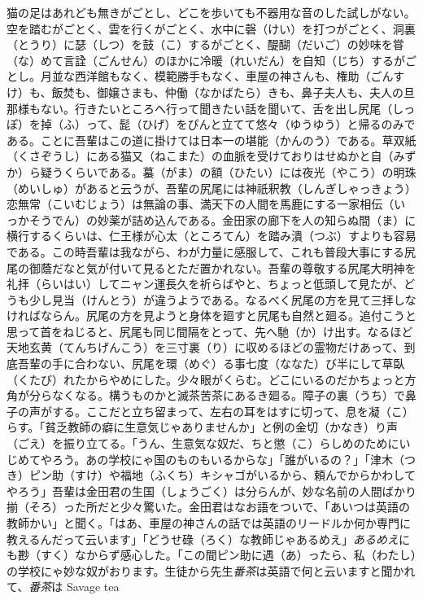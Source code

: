 \documentclass{book}
\begin{document}
猫の足はあれども無きがごとし、どこを歩いても不器用な音のした試しがない。空を踏むがごとく、雲を行くがごとく、水中に磬（けい）を打つがごとく、洞裏（とうり）に瑟（しつ）を鼓（こ）するがごとく、醍醐（だいご）の妙味を甞（な）めて言詮（ごんせん）のほかに冷暖（れいだん）を自知（じち）するがごとし。月並な西洋館もなく、模範勝手もなく、車屋の神さんも、権助（ごんすけ）も、飯焚も、御嬢さまも、仲働（なかばたら）きも、鼻子夫人も、夫人の旦那様もない。行きたいところへ行って聞きたい話を聞いて、舌を出し尻尾（しっぽ）を掉（ふ）って、髭（ひげ）をぴんと立てて悠々（ゆうゆう）と帰るのみである。ことに吾輩はこの道に掛けては日本一の堪能（かんのう）である。草双紙（くさぞうし）にある猫又（ねこまた）の血脈を受けておりはせぬかと自（みずか）ら疑うくらいである。蟇（がま）の額（ひたい）には夜光（やこう）の明珠（めいしゅ）があると云うが、吾輩の尻尾には神祇釈教（しんぎしゃっきょう）恋無常（こいむじょう）は無論の事、満天下の人間を馬鹿にする一家相伝（いっかそうでん）の妙薬が詰め込んである。金田家の廊下を人の知らぬ間（ま）に横行するくらいは、仁王様が心太（ところてん）を踏み潰（つぶ）すよりも容易である。この時吾輩は我ながら、わが力量に感服して、これも普段大事にする尻尾の御蔭だなと気が付いて見るとただ置かれない。吾輩の尊敬する尻尾大明神を礼拝（らいはい）してニャン運長久を祈らばやと、ちょっと低頭して見たが、どうも少し見当（けんとう）が違うようである。なるべく尻尾の方を見て三拝しなければならん。尻尾の方を見ようと身体を廻すと尻尾も自然と廻る。追付こうと思って首をねじると、尻尾も同じ間隔をとって、先へ馳（か）け出す。なるほど天地玄黄（てんちげんこう）を三寸裏（り）に収めるほどの霊物だけあって、到底吾輩の手に合わない、尻尾を環（めぐ）る事七度（ななた）び半にして草臥（くたび）れたからやめにした。少々眼がくらむ。どこにいるのだかちょっと方角が分らなくなる。構うものかと滅茶苦茶にあるき廻る。障子の裏（うち）で鼻子の声がする。ここだと立ち留まって、左右の耳をはすに切って、息を凝（こ）らす。「貧乏教師の癖に生意気じゃありませんか」と例の金切（かなき）り声（ごえ）を振り立てる。「うん、生意気な奴だ、ちと懲（こ）らしめのためにいじめてやろう。あの学校にゃ国のものもいるからな」「誰がいるの？」「津木（つき）ピン助（すけ）や福地（ふくち）キシャゴがいるから、頼んでからかわしてやろう」吾輩は金田君の生国（しょうごく）は分らんが、妙な名前の人間ばかり揃（そろ）った所だと少々驚いた。金田君はなお語をついで、「あいつは英語の教師かい」と聞く。「はあ、車屋の神さんの話では英語のリードルか何か専門に教えるんだって云います」「どうせ碌（ろく）な教師じゃあるめえ」\emph{あるめえ}にも尠（すく）なからず感心した。「この間ピン助に遇（あ）ったら、私（わたし）の学校にゃ妙な奴がおります。生徒から先生\emph{番茶}は英語で何と云いますと聞かれて、\emph{番茶}は Savage tea 
\end{document}
